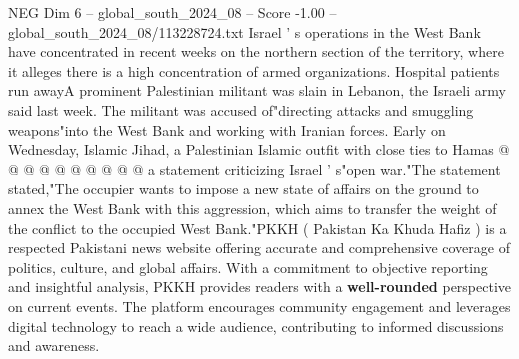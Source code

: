 \begin{textsample}{NEG Dim 6 – global\_south\_2024\_08 – Score -1.00 – global\_south\_2024\_08/113228724.txt}
Israel ' s operations in the West Bank have concentrated in recent weeks on the northern section of the territory, where it alleges there is a high concentration of armed organizations.
Hospital patients run awayA prominent Palestinian militant was slain in Lebanon, the Israeli army said last week.
The militant was accused of"directing attacks and smuggling weapons"into the West Bank and working with Iranian forces.
Early on Wednesday, Islamic Jihad, a Palestinian Islamic outfit with close ties to Hamas @ @ @ @ @ @ @ @ @ @ a statement criticizing Israel ' s"open war."The statement stated,"The occupier wants to impose a new state of affairs on the ground to annex the West Bank with this aggression, which aims to transfer the weight of the conflict to the occupied West Bank."PKKH ( Pakistan Ka Khuda Hafiz ) is a respected Pakistani news website offering accurate and comprehensive coverage of politics, culture, and global affairs.
With a commitment to objective reporting and insightful analysis, PKKH provides readers with a \textbf{well-rounded} perspective on current events.
The platform encourages community engagement and leverages digital technology to reach a wide audience, contributing to informed discussions and awareness.

\end{textsample}
